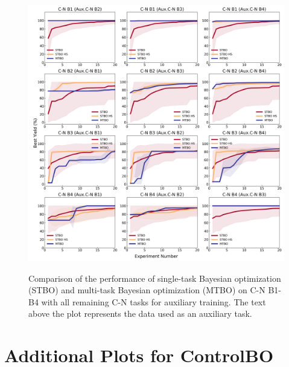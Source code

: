 \begin{figure}
\caption{Comparison of the performance of single-task Bayesian optimization (STBO) and multi-task Bayesian optimization (MTBO) on C-N B1-B4 with all remaining C-N tasks for auxiliary training. The text above the plot represents the data used as an auxiliary task.}\includegraphics[width=1\textwidth]{gfx/Appendix/baumgartner_cn_baumgartner_cn_one_cotraining_optimization.png}
\label{fig:14}
\end{figure}

\chapter{Additional Plots for ControlBO}

